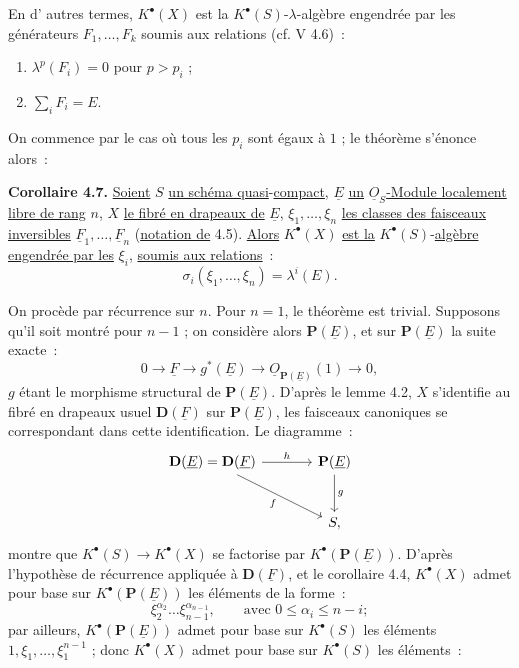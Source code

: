 
En d'%
autres termes, \(K^{\bullet}(X)\) est la \(K^{\bullet}(S)\)-\(\lambda\)-algèbre engendrée par les générateurs \(F_1,\ldots,F_k\) soumis aux relations (cf. V 4.6)~:
\begin{enumerate}[label=\textup{\roman*)}]
\item \(\lambda^p(F_i)=0\) pour \(p>p_i\) ;
\item \(\sum_i F_i=E\).
\end{enumerate}

On commence par le cas où tous les \(p_i\) sont égaux à \(1\) ; le théorème s'énonce alors~:

\textbf{Corollaire 4.7.} \uline{Soient} \(S\) \uline{un schéma quasi}-\uline{compact}, \(\underline{E}\) \uline{un} \(\underline{O}_S\)\uline{-Module localement libre de rang} \(n\), \(X\) \uline{le fibré en drapeaux de} \(\underline{E}\), \(\xi_1,\ldots,\xi_n\) \uline{les classes des faisceaux inversibles} \(\underline{F}_1,\ldots,\underline{F}_n\) (\uline{notation de} 4.5). \uline{Alors} \(K^{\bullet}(X)\) \uline{est la} \(K^{\bullet}(S)\)-\uline{algèbre engendrée par les} \(\xi_i\), \uline{soumis aux relations}~:
\[
  \sigma_i(\xi_1,\ldots,\xi_n)=\lambda^i(E).
\]

On procède par récurrence sur \(n\). Pour \(n=1\), le théorème est trivial. Supposons qu'il soit montré pour \(n-1\) ; on considère alors \(\mathbf P(\underline{E})\), et sur \(\mathbf P(\underline{E})\) la suite exacte~:
\[
  0\longrightarrow \underline{F}\longrightarrow g^*(\underline{E})\longrightarrow \underline{O}_{\mathbf P(\underline{E})}(1)\longrightarrow 0,
\]
\(g\) étant le morphisme structural de \(\mathbf P(\underline{E})\). D'après le lemme 4.2, \(X\) s'identifie au fibré en drapeaux usuel \(\mathbf D(\underline{F})\) sur \(\mathbf P(\underline{E})\), les faisceaux canoniques se correspondant dans cette identification. Le diagramme~:
\[
\begin{tikzcd}[column sep=large,row sep=large]
\mathbf D(\underline{E})=\mathbf D(\underline{F}) \arrow[r,"h"] \arrow[dr,"f"'] & \mathbf P(\underline{E}) \arrow[d,"g"]\\
& S,
\end{tikzcd}
\]
montre que \(K^{\bullet}(S)\to K^{\bullet}(X)\) se factorise par \(K^{\bullet}(\mathbf P(\underline{E}))\). D'après l'hypothèse de récurrence appliquée à \(\mathbf D(\underline{F})\), et le corollaire 4.4, \(K^{\bullet}(X)\) admet pour base sur \(K^{\bullet}(\mathbf P(\underline{E}))\) les éléments de la forme~:
\[
  \xi_2^{\alpha_2}\ldots\xi_{n-1}^{\alpha_{n-1}},
  \qquad \text{avec } 0\le\alpha_i\le n-i;
\]
par ailleurs, \(K^{\bullet}(\mathbf P(\underline{E}))\) admet pour base sur \(K^{\bullet}(S)\) les éléments \(1,\xi_1,\ldots,\xi_1^{n-1}\) ; donc \(K^{\bullet}(X)\) admet pour base sur \(K^{\bullet}(S)\) les éléments~:
